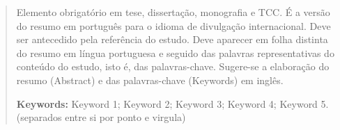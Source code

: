 \begin{otherlanguage}{english}
    \renewcommand{\abstractname}{ABSTRACT}
    \begin{abstract}
        Elemento obrigatório em tese, dissertação, monografia e TCC. É a versão do
        resumo em português para o idioma de divulgação internacional. Deve ser
        antecedido pela referência do estudo. Deve aparecer em folha distinta do resumo
        em língua portuguesa e seguido das palavras representativas do conteúdo do
        estudo, isto é, das palavras-chave. Sugere-se a elaboração do resumo (Abstract) e
        das palavras-chave (Keywords) em inglês.
        \vspace{0.5cm}

        \noindent\textbf{Keywords:} Keyword 1; Keyword 2; Keyword 3; Keyword 4; Keyword 5.
        (separados entre si por ponto e virgula)
    \end{abstract}
\end{otherlanguage}
